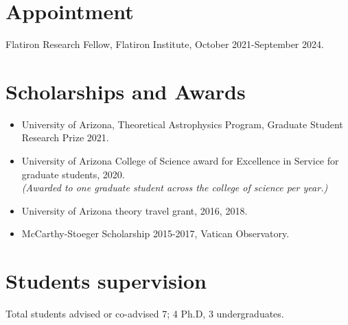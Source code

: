 \documentclass[UTF8]{article}
\begin{document}
\section*{Appointment}
\indent Flatiron Research Fellow, Flatiron Institute, October 2021-September 2024.

\section*{Scholarships and Awards}


\begin{itemize}
  \setlength\itemsep{0.0em}
  \renewcommand\labelitemi{$\cdot$}

\item University of Arizona, Theoretical Astrophysics Program, Graduate Student
Research Prize 2021.
\item University of Arizona College of Science award for Excellence in
Service for graduate students, 2020.\\ 
\indent \textit{(Awarded to one graduate student across the college of
science per year.)}
\item University of Arizona theory travel grant, 2016, 2018. 
\item McCarthy-Stoeger Scholarship 2015-2017, Vatican Observatory.
\end{itemize}


\section*{Students supervision}

Total students advised or co-advised 7; 4 Ph.D, 3 undergraduates.
\end{document}
